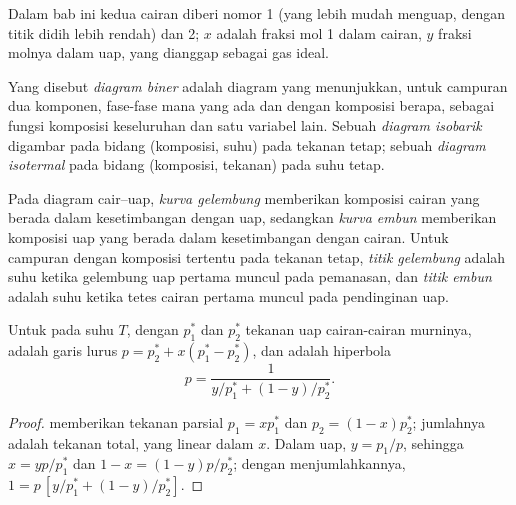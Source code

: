 Dalam bab ini kedua cairan diberi nomor 1 (yang lebih mudah menguap,
dengan titik didih lebih rendah) dan 2; $x$ adalah fraksi mol 1 dalam
cairan, $y$ fraksi molnya dalam uap, yang dianggap sebagai gas ideal.

\begin{definition}\label{def:b2:liquid-vapour-diagrams:binary-diagram}
Yang disebut \emph{diagram biner} adalah diagram yang
menunjukkan, untuk campuran dua komponen, fase-fase mana yang ada dan
dengan komposisi berapa, sebagai fungsi komposisi keseluruhan dan satu
variabel lain. Sebuah \emph{diagram isobarik}
digambar pada bidang (komposisi, suhu) pada tekanan tetap; sebuah
\emph{diagram isotermal} pada bidang (komposisi,
tekanan) pada suhu tetap.
\end{definition}

\begin{definition}\label{def:b2:liquid-vapour-diagrams:bubble-dew}
Pada diagram cair--uap, \emph{kurva gelembung}
memberikan komposisi cairan yang berada dalam kesetimbangan dengan uap,
sedangkan \emph{kurva embun} memberikan komposisi uap
yang berada dalam kesetimbangan dengan cairan. Untuk campuran dengan
komposisi tertentu pada tekanan tetap, \emph{titik gelembung}
adalah suhu ketika gelembung uap pertama muncul pada pemanasan, dan
\emph{titik embun} adalah suhu ketika tetes cairan
pertama muncul pada pendinginan uap.
\end{definition}

\begin{proposition}\label{prop:b2:liquid-vapour-diagrams:ideal-curves}
Untuk  pada suhu $T$, dengan $p_1^*$ dan $p_2^*$ tekanan uap
cairan-cairan murninya,   adalah garis
lurus $p = p_2^* + x(p_1^* - p_2^*)$, dan  adalah hiperbola
\[
  p = \frac{1}{y/p_1^* + (1 - y)/p_2^*} .
\]
\end{proposition}

\begin{proof}
 memberikan tekanan parsial $p_1 = xp_1^*$ dan
$p_2 = (1 -
x)p_2^*$; jumlahnya adalah tekanan total, yang linear dalam
$x$. Dalam uap, $y = p_1/p$, sehingga $x = yp/p_1^*$ dan
$1 - x = (1 - y)p/p_2^*$; dengan menjumlahkannya,
$1 = p\,[y/p_1^* + (1 - y)/p_2^*]$.
\end{proof}

